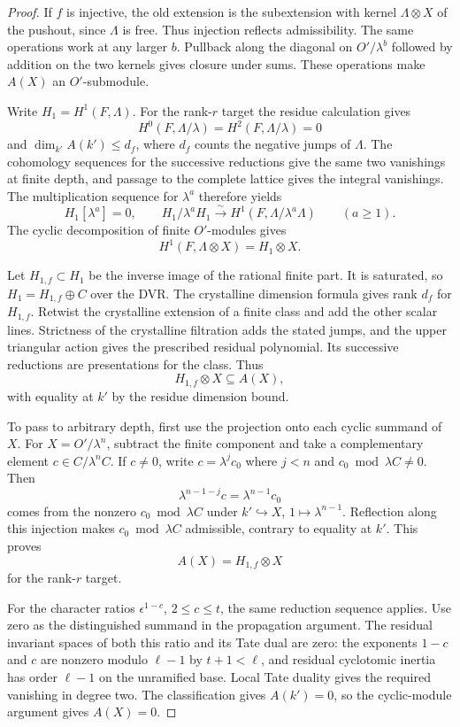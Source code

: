 \begin{proof}
If \(f\) is injective, the old extension is the
subextension with kernel \(\Lambda\otimes X\) of the pushout,
since \(\Lambda\) is free. Thus injection reflects admissibility.
The same operations work at any larger \(b\). Pullback along the
diagonal on \(O'/\lambda^b\) followed by addition on the two
kernels gives closure under sums. These operations make \(A(X)\)
an \(O'\)-submodule.

Write \(H_1=H^1(F,\Lambda)\). For the rank-\(r\) target the
residue calculation gives
\[
 H^0(F,\Lambda/\lambda)= H^2(F,\Lambda/\lambda)=0
\]
and \(\dim_{k'} A(k')\le d_f\),
where \(d_f\) counts the negative jumps of \(\Lambda\).
The cohomology sequences for the successive reductions
give the same two vanishings at finite depth, and passage to
the complete lattice gives the integral vanishings.
The multiplication sequence for \(\lambda^a\) therefore yields
\[
    H_1[\lambda^a]=0,\qquad
    H_1/\lambda^a H_1\xrightarrow{\sim}
                H^1(F,\Lambda/\lambda^a\Lambda)
            \qquad(a\ge1).
\]
The cyclic decomposition of finite \(O'\)-modules gives
\[
 H^1(F,\Lambda\otimes X)=H_1\otimes X.
\]

Let \(H_{1,f}\subset H_1\) be the inverse image of the rational
finite part. It is saturated, so \(H_1=H_{1,f}\oplus C\)
over the DVR. The crystalline dimension formula gives rank \(d_f\)
for \(H_{1,f}\). Retwist the crystalline extension of a finite
class and add the other scalar lines. Strictness of the
crystalline filtration adds the stated jumps, and the upper
triangular action gives the prescribed residual polynomial.
Its successive reductions are presentations for the class.
Thus
\[
 H_{1,f}\otimes X\subseteq A(X),
\]
with equality at \(k'\)
by the residue dimension bound.

To pass to arbitrary depth, first use the projection onto
each cyclic summand of \(X\). For \(X=O'/\lambda^n\), subtract
the finite component and take a complementary element
\(c\in C/\lambda^n C\). If \(c\ne0\), write \(c=\lambda^j c_0\)
where \(j<n\) and \(c_0\bmod\lambda C\ne0\). Then
\[
    \lambda^{n-1-j}c=\lambda^{n-1}c_0
\]
comes from the nonzero \(c_0\bmod\lambda C\) under
\(k'\hookrightarrow X\), \(1\mapsto\lambda^{n-1}\).
Reflection along this injection makes \(c_0\bmod\lambda C\)
admissible, contrary to equality at \(k'\). This proves
\[
 A(X)=H_{1,f}\otimes X
\]
for the rank-\(r\) target.

For the character ratios \(\epsilon^{1-c}\), \(2\le c\le t\),
the same reduction sequence applies. Use zero as the distinguished
summand in the propagation argument.
The residual invariant spaces of both this ratio and its
Tate dual are zero: the exponents \(1-c\) and \(c\) are
nonzero modulo \(\ell-1\) by \(t+1<\ell\), and residual
cyclotomic inertia has order \(\ell-1\) on the unramified
base. Local Tate duality gives the required vanishing in
degree two. The classification gives \(A(k')=0\), so
the cyclic-module argument gives \(A(X)=0\).


\end{proof}
